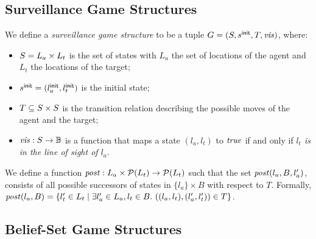 \subsection{Surveillance Game Structures}
We define a \emph{surveillance game structure} to be  a tuple $G  = (S,s^{\mathsf{init}},T,\mathit{vis})$, where:
\begin{itemize}
\item $S = L_a \times L_t$ is the set of states with $L_a$ the set of locations of the agent and $L_t$ the locations of the target;
\item $s^{\mathsf{init}} = (l_a^{\mathsf{init}},l_t^{\mathsf{init}})$ is the initial state;
\item $T \subseteq S \times S$ is the transition relation describing the possible moves of the agent and the target;
\item $\mathit{vis} : S \to \mathbb{B}$ is a function that maps a state $(l_a,l_t)$ to $\mathit{true}$ if and only if\emph{ $l_t$ is in the line of sight of $l_a$}.
\end{itemize}

\begin{example}
\end{example}


We define a function $\mathit{post} : L_a \times \mathcal{P}(L_t) \to \mathcal{P}(L_t)$ such that the set $\mathit{post}(l_a,B,l_a')$, consists of all possible successors of states in $\{l_a\} \times B$ with respect to $T$. Formally, $\mathit{post}(l_a, B) = \{l_t' \in L_t \mid \exists l_a' \in L_a, l_t \in B.\ ((l_a,l_t),(l_a',l_t')) \in T \}$.

\subsection{Belief-Set Game Structures}


